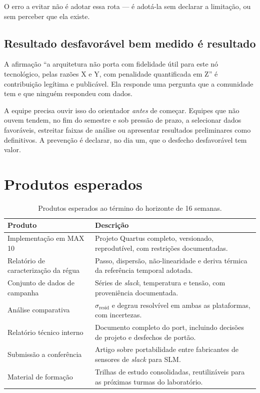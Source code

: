 \documentclass[11pt,a4paper]{article}
\begin{document}
O erro a evitar não é adotar essa rota --- é adotá-la sem declarar a limitação, ou
sem perceber que ela existe.

\subsection{Resultado desfavorável bem medido é resultado}
\label{sec:resultado-desfavoravel}

A afirmação ``a arquitetura não porta com fidelidade útil para este nó tecnológico,
pelas razões X e Y, com penalidade quantificada em Z'' é contribuição legítima e
publicável. Ela responde uma pergunta que a comunidade tem e que ninguém respondeu
com dados.

A equipe precisa ouvir isso do orientador \emph{antes} de começar. Equipes que não
ouvem tendem, no fim do semestre e sob pressão de prazo, a selecionar dados
favoráveis, estreitar faixas de análise ou apresentar resultados preliminares como
definitivos. A prevenção é declarar, no dia um, que o desfecho desfavorável tem valor.

\section{Produtos esperados}
\label{sec:produtos}

\begin{table}[htbp]
\centering
\caption{Produtos esperados ao término do horizonte de 16 semanas.}
\label{tab:produtos}
\small
\begin{tabularx}{\textwidth}{@{}L{4.6cm} X@{}}
\toprule
\textbf{Produto} & \textbf{Descrição} \\
\midrule
Implementação em MAX 10 & Projeto Quartus completo, versionado, reprodutível, com restrições documentadas. \\
Relatório de caracterização da régua & Passo, dispersão, não-linearidade e deriva térmica da referência temporal adotada. \\
Conjunto de dados de campanha & Séries de \emph{slack}, temperatura e tensão, com proveniência documentada. \\
Análise comparativa & $\sigma_\text{resid}$ e degrau resolvível em ambas as plataformas, com incertezas. \\
Relatório técnico interno & Documento completo do port, incluindo decisões de projeto e desfechos de portão. \\
Submissão a conferência & Artigo sobre portabilidade entre fabricantes de sensores de \emph{slack} para SLM. \\
Material de formação & Trilhas de estudo consolidadas, reutilizáveis para as próximas turmas do laboratório. \\
\bottomrule
\end{tabularx}
\end{table}
\end{document}
